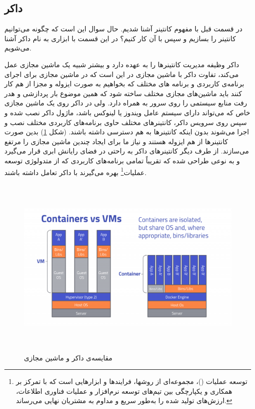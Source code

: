 \subsection{داکر}

در قسمت قبل با مفهوم کانتینر آشنا شدیم. حال سوال این است که چگونه می‌توانیم کانتینر را بسازیم و سپس با آن کار کنیم؟ در این قسمت با ابزاری به نام داکر آشنا می‌شویم.

داکر وظیفه مدیریت کانتینرها را به عهده دارد و بیشتر شبیه یک ماشین مجازی عمل می‌کند، تفاوت داکر با ماشین مجازی در این است که در ماشین مجازی برای اجرای برنامه‌ی کاربردی و برنامه های مختلف که بخواهیم به صورت ایزوله و مجزا از هم کار کنند باید ماشین‌های مجازی مختلف ساخته شود که همین موضوع بار پردازشی و هدر رفت منابع سیستمی را روی سرور به همراه دارد. ولی در داکر روی یک ماشین مجازی خاص که می‌تواند دارای سیستم عامل ویندوز یا لینوکس باشد، ماژول داکر نصب شده و سپس روی سرویس داکر، کانتینرهای مختلف حاوی برنامه‌های کاربردی مختلف نصب و اجرا می‌شوند بدون اینکه کانتینرها به هم دسترسی داشته باشند. (شکل \ref{dockerVsVm}) بدین صورت کانتینرها از هم ایزوله هستند و نیاز ما برای ایجاد چندین ماشین مجازی را مرتفع می‌سازند. از طرف دیگر کانتینرهای داکر به راحتی در فضای رایانش ابری قرار می‌گیرد و به نوعی طراحی شده که تقریباً تمامی برنامه‌های کاربردی که از متدولوژی توسعه عملیات\footnote{توسعه عملیات ()، مجموعه‌ای از روشها، فرایندها و ابزارهایی است که با تمرکز بر همکاری و یکپارچگی بین تیم‌های توسعه نرم‌افزار و عملیات فناوری اطلاعات، ارزش‌های تولید شده را به‌طور سریع و مداوم به مشتریان نهایی می‌رساند.} بهره می‌گیرند با داکر تعامل داشته باشند.

\begin{figure}[!h]
	\centering
	\includegraphics[height=9cm]{images/Docker-vs-VM}
	\caption{مقایسه‌ی داکر و ماشین مجازی}
	\label{dockerVsVm}
\end{figure}

